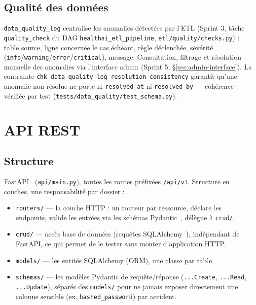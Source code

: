 \documentclass{article}
\begin{document}
\subsection{Qualité des données}

\texttt{data\_quality\_log} centralise les anomalies détectées par l'ETL (Sprint 3, tâche \texttt{quality\_check} du DAG \texttt{healthai\_etl\_pipeline}, \texttt{etl/quality/checks.py}) : table source, ligne concernée le cas échéant, règle déclenchée, sévérité (\texttt{info}/\texttt{warning}/\texttt{error}/\texttt{critical}), message. Consultation, filtrage et résolution manuelle des anomalies via l'interface admin (Sprint 5, \S\ref{sec:admin-interface}). La contrainte \texttt{chk\_data\_quality\_log\_resolution\_consistency} garantit qu'une anomalie non résolue ne porte ni \texttt{resolved\_at} ni \texttt{resolved\_by} — cohérence vérifiée par test (\texttt{tests/data\_quality/test\_schema.py}).

\section{API REST}

\subsection{Structure}

FastAPI~\citep{fastapi} (\texttt{api/main.py}), toutes les routes préfixées \texttt{/api/v1}. Structure en couches, une responsabilité par dossier :

\begin{itemize}[leftmargin=1.4em]
  \item \texttt{routers/} — la couche HTTP : un routeur par ressource, déclare les endpoints, valide les entrées via les schémas Pydantic~\citep{pydantic}, délègue à \texttt{crud/}.
  \item \texttt{crud/} — accès base de données (requêtes SQLAlchemy~\citep{sqlalchemy}), indépendant de FastAPI, ce qui permet de le tester sans monter d'application HTTP.
  \item \texttt{models/} — les entités SQLAlchemy (ORM), une classe par table.
  \item \texttt{schemas/} — les modèles Pydantic de requête/réponse (\texttt{...Create}, \texttt{...Read}, \texttt{...Update}), séparés des \texttt{models/} pour ne jamais exposer directement une colonne sensible (ex. \texttt{hashed\_password}) par accident.
\end{itemize}
\end{document}
